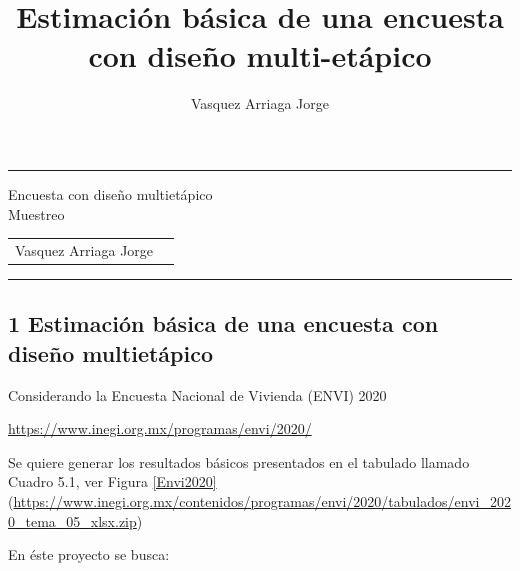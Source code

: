 \documentclass[
]{article}
\title{Estimación básica de una encuesta con diseño multi-etápico}
\author{Vasquez Arriaga Jorge}
\date{}
\begin{document}
\thispagestyle{plain}
\hrule
\begin{center}
	\vspace{0.2cm}
	\huge{Encuesta con diseño
		multietápico}\\
	
	\large{Muestreo}
\end{center}

\vspace{0.1cm}

\begin{table}[h]
	\centering
	\begin{tabular}{ll}
		Vasquez Arriaga Jorge 
	\end{tabular}
\end{table}

\hrule

\vspace{5mm}

\setlength{\parindent}{0cm}


\hypertarget{estimaciuxf3n-buxe1sica-de-una-encuesta-con-diseuxf1o-multietuxe1pico}{%
\subsection{1 Estimación básica de una encuesta con diseño
multietápico}\label{estimaciuxf3n-buxe1sica-de-una-encuesta-con-diseuxf1o-multietuxe1pico}}

Considerando la Encuesta Nacional de Vivienda (ENVI) 2020

\url{https://www.inegi.org.mx/programas/envi/2020/}

Se quiere generar los resultados básicos
presentados en el tabulado llamado Cuadro 5.1, ver Figura \ref{Envi2020}
(\url{https://www.inegi.org.mx/contenidos/programas/envi/2020/tabulados/envi_2020_tema_05_xlsx.zip})

En éste proyecto se busca:
\end{document}
